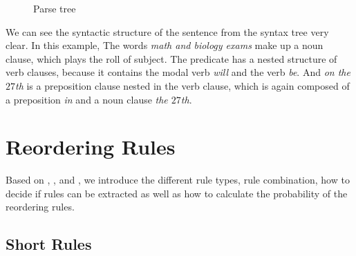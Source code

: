 \begin{figure}
\centering

\caption{Parse tree}
\label{ParseTree}
\end{figure}

We can see the syntactic structure of the sentence from the syntax tree very clear. In this example, The words \emph{math and biology exams} make up a noun clause, which plays the roll of subject. The predicate has a nested structure of verb clauses, because it contains the modal verb \emph{will} and the verb \emph{be}. And \emph{on the $27$th} is a preposition clause nested in the verb clause, which is again composed of a preposition \emph{in} and a noun clause \emph{the $27$th}.


\section{Reordering Rules}
\label{ch:Foundations:sec:types}

Based on \cite{short}, \cite{long}, \cite{tree} and \cite{combine}, we introduce the different rule types, rule combination, how to decide if rules can be extracted as well as how to calculate the probability of the reordering rules.

\subsection{Short Rules}

